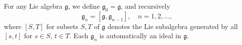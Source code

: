 For any Lie algebra $\mathfrak{g}$, we define $\mathfrak{g}_0 = \mathfrak{g}$, and recursively
$$\mathfrak{g}_n = [\mathfrak{g}, \mathfrak{g}_{n-1}], \quad n = 1, 2, \ldots,$$
where $[S, T]$ for subsets $S, T$ of $\mathfrak{g}$ denotes the Lie subalgebra generated by all $[s, t]$ for $s \in S$, $t \in T$. Each $\mathfrak{g}_n$ is automatically an ideal in $\mathfrak{g}$.
